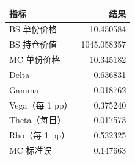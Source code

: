 \begin{tabular}{lr}
\toprule
指标 & 结果 \\
\midrule
BS 单份价格 & 10.450584 \\
BS 持仓价值 & 1045.058357 \\
MC 单份价格 & 10.345182 \\
Delta & 0.636831 \\
Gamma & 0.018762 \\
Vega（每 1 pp） & 0.375240 \\
Theta（每日） & -0.017573 \\
Rho（每 1 pp） & 0.532325 \\
MC 标准误 & 0.147663 \\
\bottomrule
\end{tabular}

